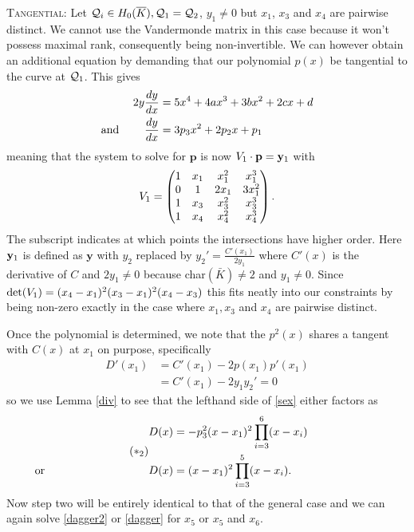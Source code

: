 \documentclass[english,11pt,a4paper]{article}
\begin{document}
\setcounter{case}{1}
\begin{case}
  {\scshape Tangential:} Let $\mathcal{Q}_i\in H_0(\overline K), \mathcal{Q}_1 = \mathcal{Q}_2$, $y_1 \neq 0$ but $x_1$, $x_3$ and $x_4$ are pairwise distinct. We cannot use the Vandermonde matrix in this case because it won't possess maximal rank, consequently being non-invertible. We can however obtain an additional equation by demanding that our polynomial $p(x)$ be tangential to the curve at $\mathcal{Q}_1$. This gives
  \begin{align*}
    2 y \frac{dy}{dx} &= 5  x^4 + 4 a x^3 + 3 b x^2 + 2 c x + d \\
    \text{and\hspace{8mm}} \frac{dy}{dx} &= 3 p_3 x^2 + 2 p_2 x + p_1
  \end{align*}
  meaning that the system to solve for $\mathbf{p}$ is now $V_1 \cdot \mathbf{p} = \mathbf{y}_1$ with
  \begin{align*}V_1=
    \begin{pmatrix}
      1 & x_1 & x_1^2 & x_1^3\\
      0 & 1 & 2 x_1 & 3 x_1^2\\
      1 & x_3 & x_3^2 & x_3^3\\
      1 & x_4 & x_4^2 & x_4^3\\
    \end{pmatrix}.
  \end{align*}
  The subscript indicates at which points the intersections have higher order.
  Here $\mathbf{y}_1$ is defined as $\mathbf{y}$ with $y_2$ replaced by $y_2'=\frac{C'(x_1)}{2 y_1}$ where $C'(x)$ is the derivative of $C$ and $2y_1 \neq 0$ because char$(\bar K) \neq 2$ and $y_1\neq 0$. Since $\det(V_1) = (x_4-x_1)^2(x_3-x_1)^2(x_4-x_3)$ this fits neatly into our constraints by being non-zero exactly in the case where $x_1, x_3$ and $x_4$ are pairwise distinct.

  Once the polynomial is determined, we note that the $p^2(x)$ shares a tangent with $C(x)$ at $x_1$ on purpose, specifically
  \begin{align*}
    D'(x_1) &= C'(x_1) - 2 p(x_1)p'(x_1)\\
            &= C'(x_1) - 2 y_1 y_2' = 0
  \end{align*}
  so we use Lemma \ref{div} to see that the lefthand side of \eqref{sex} either factors as
  \begin{align} \tag{$*_2$} \begin{split}
    D(x) &= -p_3^2(x-x_1)^2 \prod_{i=3}^6(x-x_i)\\
    \rlap{\hspace{-37mm} or}
    D(x) &= (x-x_1)^2 \prod_{i=3}^5(x-x_i).
  \end{split} \end{align}
  Now step two will be entirely identical to that of the general case and we can again solve \eqref{dagger2} or \eqref{dagger} for $x_5$ or $x_5$ and $x_6$.
\end{case}
\end{document}
